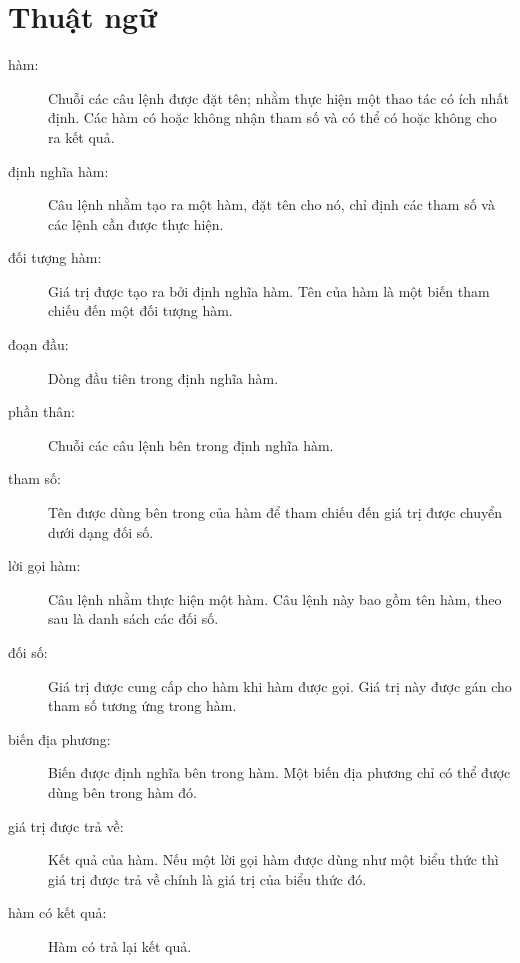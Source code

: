 \documentclass[11pt]{book}
\begin{document}
\section{Thuật ngữ}

\begin{description}

\item[hàm:] Chuỗi các câu lệnh được đặt tên; nhằm thực hiện một
thao tác có ích nhất định. Các hàm có hoặc không nhận tham số và
có thể có hoặc không cho ra kết quả.

\item[định nghĩa hàm:] Câu lệnh nhằm tạo ra một hàm, đặt tên
cho nó, chỉ định các tham số và các lệnh cần được thực hiện.

\item[đối tượng hàm:] Giá trị được tạo ra bởi định nghĩa hàm.
Tên của hàm là một biến tham chiếu đến một đối tượng hàm.

\item[đoạn đầu:] Dòng đầu tiên trong định nghĩa hàm.

\item[phần thân:] Chuỗi các câu lệnh bên trong định nghĩa hàm.

\item[tham số:] Tên được dùng bên trong của hàm để tham chiếu
đến giá trị được chuyển dưới dạng đối số.

\item[lời gọi hàm:] Câu lệnh nhằm thực hiện một hàm. Câu lệnh
này bao gồm tên hàm, theo sau là danh sách các đối số.

\item[đối số:]  Giá trị được cung cấp cho hàm khi hàm được gọi.
Giá trị này được gán cho tham số tương ứng trong hàm.

\item[biến địa phương:]  Biến được định nghĩa bên trong hàm.
Một biến địa phương chỉ có thể được dùng bên trong hàm đó.

\item[giá trị được trả về:]  Kết quả của hàm. Nếu một lời gọi hàm được
dùng như một biểu thức thì giá trị được trả về chính là giá trị của biểu
thức đó.

\item[hàm có kết quả:] Hàm có trả lại kết quả.


\end{description}
\end{document}
